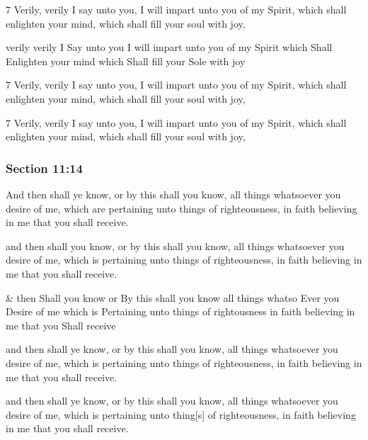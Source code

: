 		\begin{framed}
		\scriptsize
			\begin{compactdesc}
				\item[JSP] 7 Verily, verily I say unto you, I will impart unto you of my Spirit, which shall enlighten your mind, which shall fill your soul with joy,
				\item[HS] verily verily I Say unto you I will impart unto you of my Spirit which Shall Enlighten your mind which Shall fill your Sole with joy 
				\item[DC 1835] 7 Verily, verily I say unto you, I will impart unto you of my Spirit, which shall enlighten your mind, which shall fill your soul with joy,
				\item[DC 1844] 7 Verily, verily I say unto you, I will impart unto you of my Spirit, which shall enlighten your mind, which shall fill your soul with joy, 
			\end{compactdesc}
		\end{framed}

	\subsubsection{Section 11:14} %
		\label{DC11-14}

		And then shall ye know, or by this shall you know, all things whatsoever you desire of me, which are pertaining unto things of righteousness, in faith believing in me that you shall receive.

		\begin{framed}
		\scriptsize
			\begin{compactdesc}
				\item[JSP] and then shall you know, or by this shall you know, all things whatsoever you desire of me, which is pertaining unto things of righteousness, in faith believing in me that you shall receive.
				\item[HS] \& then Shall you know or By this shall you know all things whatso Ever you Desire of me which is Pertaining unto things of rightousness in faith believing in me that you Shall receive 
				\item[DC 1835] and then shall ye know, or by this shall you know, all things whatsoever you desire of me, which is pertaining unto things of righteousness, in faith believing in me that you shall receive.
				\item[DC 1844] and then shall ye know, or by this shall you know, all things whatsoever you desire of me, which is pertaining unto thing[s] of righteousness, in faith believing in me that you shall receive.
			\end{compactdesc}
		\end{framed}

